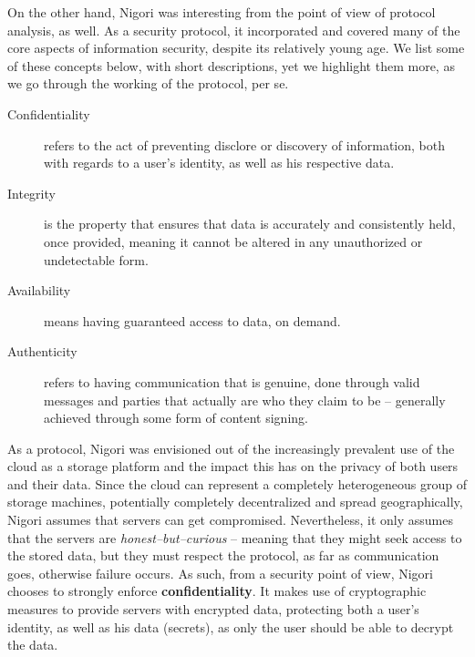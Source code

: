 On the other hand, Nigori was interesting from the point of view of protocol analysis, as well.
As a security protocol, it incorporated and covered many of the core aspects of information security, despite its relatively young age.
We list some of these concepts below, with short descriptions, yet we highlight them more, as we go through the working of the protocol, per se.
\begin{description}
\item[Confidentiality] refers to the act of preventing disclore or discovery of information, both with regards to a user's identity, as well as his respective data.

\item[Integrity] is the property that ensures that data is accurately and consistently held, once provided, meaning it cannot be altered in any unauthorized or undetectable form.

\item[Availability] means having guaranteed access to data, on demand.

\item[Authenticity] refers to having communication that is genuine, done through valid messages and parties that actually are who they claim to be -- generally achieved through some form of content signing.
\end{description}

As a protocol, Nigori was envisioned out of the increasingly prevalent use of the cloud as a storage platform and the impact this has on the privacy of both users and their data.
Since the cloud can represent a completely heterogeneous group of storage machines, potentially completely decentralized and spread geographically, Nigori assumes that servers can get compromised.
Nevertheless, it only assumes that the servers are \textit{honest--but--curious} -- meaning that they might seek access to the stored data, but they must respect the protocol, as far as communication goes, otherwise failure occurs.
As such, from a security point of view, Nigori chooses to strongly enforce \textbf{confidentiality}.
It makes use of cryptographic measures to provide servers with encrypted data, protecting both a user's identity, as well as his data (secrets), as only the user should be able to decrypt the data.

